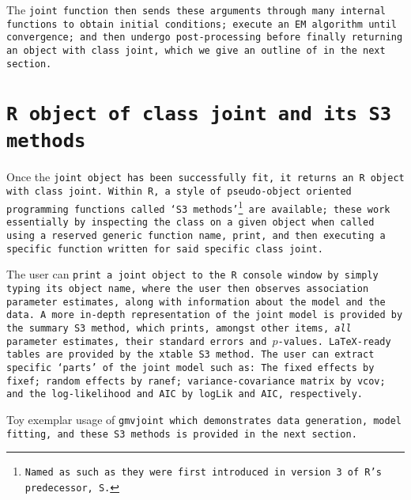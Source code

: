 The \tt{joint} function then sends these arguments through many internal functions to obtain initial conditions; execute an EM algorithm until convergence; and then undergo post-processing before finally returning an object with class \tt{joint}, which we give an outline of in the next section.

\section{\tt{R} object of class \tt{joint} and its S3 methods}\label{sec:appendix-gmvjoint-joint-object}
Once the \tt{joint} object has been successfully fit, it returns an \tt{R} object with class \tt{joint}. Within \tt{R}, a style of pseudo-object oriented programming functions called `S3 methods'\footnote{Named as such as they were first introduced in version 3 of \tt{R}'s predecessor, \tt{S}.} are available; these work essentially by inspecting the class on a given object when called using a reserved generic function name, \eg \tt{print}, and then executing a specific function written for said specific class \tt{joint}. 

The user can \tt{print} a \tt{joint} object to \eg the \tt{R} console window by simply typing its object name, where the user then observes association parameter estimates, along with information about the model and the data. A more in-depth representation of the joint model is provided by the \tt{summary} S3 method, which prints, amongst other items, \textit{all} parameter estimates, their standard errors and $p$-values. \LaTeX-ready tables are provided by the \tt{xtable} S3 method. The user can extract specific `parts' of the joint model such as: The fixed effects by \tt{fixef}; random effects by \tt{ranef}; variance-covariance matrix by \tt{vcov}; and the log-likelihood and AIC by \tt{logLik} and \tt{AIC}, respectively. 

Toy exemplar usage of \tt{gmvjoint} which demonstrates data generation, model fitting, and these S3 methods is provided in the next section.

